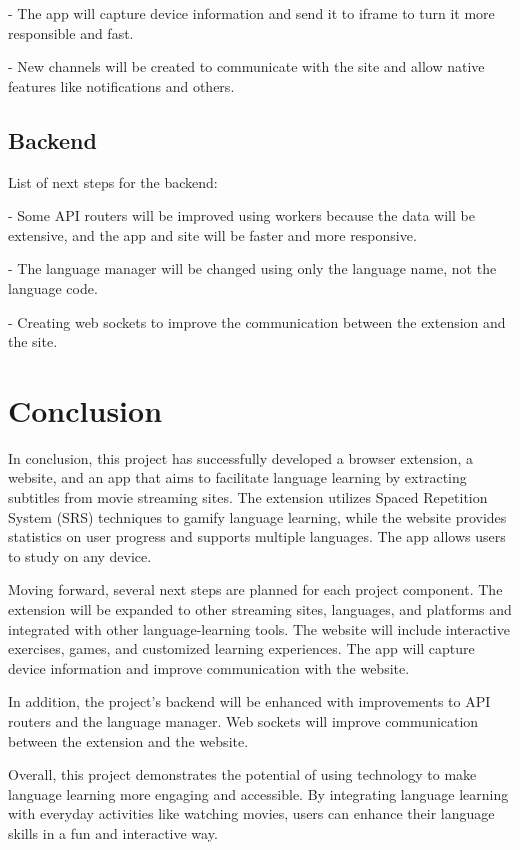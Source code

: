 \documentclass[12pt]{article}
\begin{document}
- The app will capture device information and send it to iframe to turn it more responsible and fast. 

- New channels will be created to communicate with the site and allow native features like notifications and others.

\subsection{Backend} 

List of next steps for the backend:

- Some API routers will be improved using workers because the data will be extensive, and the app and site will be faster and more responsive.

- The language manager will be changed using only the language name, not the language code. 

- Creating web sockets to improve the communication between the extension and the site.

\section{Conclusion}

In conclusion, this project has successfully developed a browser extension, a website, and an app that aims to facilitate language learning by extracting subtitles from movie streaming sites. The extension utilizes Spaced Repetition System (SRS) techniques to gamify language learning, while the website provides statistics on user progress and supports multiple languages. The app allows users to study on any device.

Moving forward, several next steps are planned for each project component. The extension will be expanded to other streaming sites, languages, and platforms and integrated with other language-learning tools. The website will include interactive exercises, games, and customized learning experiences. The app will capture device information and improve communication with the website.

In addition, the project's backend will be enhanced with improvements to API routers and the language manager. Web sockets will improve communication between the extension and the website.

Overall, this project demonstrates the potential of using technology to make language learning more engaging and accessible. By integrating language learning with everyday activities like watching movies, users can enhance their language skills in a fun and interactive way.
\end{document}

